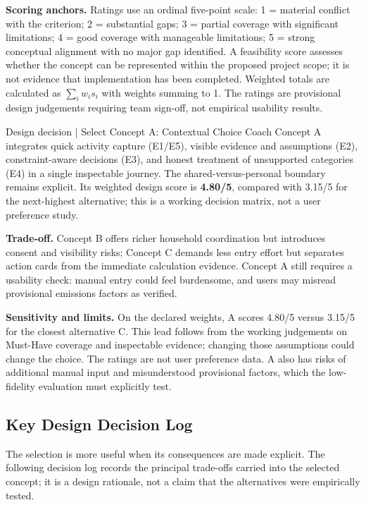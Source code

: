 \documentclass[12pt,a4paper]{article}
\begin{document}
\textbf{Scoring anchors.} Ratings use an ordinal five-point scale: 1 = material conflict with the criterion; 2 = substantial gaps; 3 = partial coverage with significant limitations; 4 = good coverage with manageable limitations; 5 = strong conceptual alignment with no major gap identified. A feasibility score assesses whether the concept can be represented within the proposed project scope; it is not evidence that implementation has been completed. Weighted totals are calculated as $\sum_i w_i s_i$ with weights summing to 1. The ratings are provisional design judgements requiring team sign-off, not empirical usability results.

\begin{insightbox}{Design decision | Select Concept A: Contextual Choice Coach}
Concept A integrates quick activity capture (E1/E5), visible evidence and assumptions (E2), constraint-aware decisions (E3), and honest treatment of unsupported categories (E4) in a single inspectable journey. The shared-versus-personal boundary remains explicit. Its weighted design score is \textbf{4.80/5}, compared with 3.15/5 for the next-highest alternative; this is a working decision matrix, not a user preference study.
\end{insightbox}

\textbf{Trade-off.} Concept B offers richer household coordination but introduces consent and visibility risks; Concept C demands less entry effort but separates action cards from the immediate calculation evidence. Concept A still requires a usability check: manual entry could feel burdensome, and users may misread provisional emissions factors as verified.

\textbf{Sensitivity and limits.} On the declared weights, A scores 4.80/5 versus 3.15/5 for the closest alternative C. This lead follows from the working judgements on Must-Have coverage and inspectable evidence; changing those assumptions could change the choice. The ratings are not user preference data. A also has risks of additional manual input and misunderstood provisional factors, which the low-fidelity evaluation must explicitly test.

\subsection{Key Design Decision Log}
The selection is more useful when its consequences are made explicit. The following decision log records the principal trade-offs carried into the selected concept; it is a design rationale, not a claim that the alternatives were empirically tested.
\end{document}
